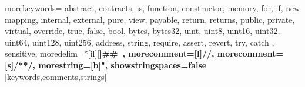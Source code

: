 

%
{morekeywords={
  abstract, contracts, is,
  function, constructor, memory,
  for, if, new
  mapping,
  internal, external, pure, view, payable, return, returns,
  public, private, virtual, override,
  true, false, bool,
  bytes, bytes32,
  uint, uint8, uint16, uint32, uint64, uint128, uint256,
  address, string,
  require, assert, revert, try, catch
  },%
  sensitive,%
  moredelim=*[il][\bfseries]{\#\#\ },
  morecomment=[l]//,%
  morecomment=[s]{/*}{*/},%
  morestring=[b]",%
  showstringspaces=false%
}[keywords,comments,strings]%



\newcommand{\commentstyle}[1]{\color{ccomment}\itshape{#1}}
\newcommand{\keywordstyle}[1]{\color{ckeyword}\bfseries{#1}}
\newcommand{\stringstyle}[1]{\color{cstring}\text{#1}}


